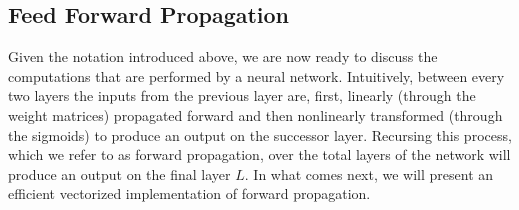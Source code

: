 \subsection{Feed Forward Propagation}\label{Sec:Notation}
Given the notation introduced above, we are now ready to discuss the computations that are performed by a neural network. Intuitively, between every two layers the inputs from the previous layer are, first, linearly (through the weight matrices) propagated forward and then nonlinearly transformed (through the sigmoids) to produce an output on the successor layer. Recursing this process, which we refer to as forward propagation, over the total layers of the network will produce an output on the final layer $L$. In what comes next, we will present an efficient vectorized implementation of forward propagation. 

